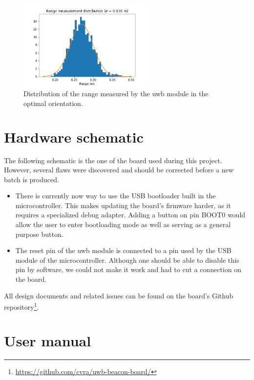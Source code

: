 \documentclass[a4paper]{scrreprt}
\begin{document}
\begin{figure}[h]
    \centering
    \includegraphics[width=0.6\textwidth]{experiments/range_noise.png}
    \caption{Distribution of the range measured by the \gls{uwb} module in the optimal orientation.}
    \label{fig:range_noise}
\end{figure}


\appendix
\chapter{Hardware schematic}

The following schematic is the one of the board used during this project.
However, several flaws were discovered and should be corrected before a new batch is produced.

\begin{itemize}
    \item There is currently now way to use the USB bootloader built in the microcontroller.
        This makes updating the board's firmware harder, as it requires a specialized debug adapter.
        Adding a button on pin BOOT0 would allow the user to enter bootloading mode as well as serving as a general purpose button.
    \item The reset pin of the \gls{uwb} module is connected to a pin used by the USB module of the microcontroller.
        Although one should be able to disable this pin by software, we could not make it work and had to cut a connection on the board.
\end{itemize}

All design documents and related issues can be found on the board's Github repository\footnote{\url{https://github.com/cvra/uwb-beacon-board/}}.




\chapter{User manual}


\clearpage
\nocite{*} %


\end{document}
